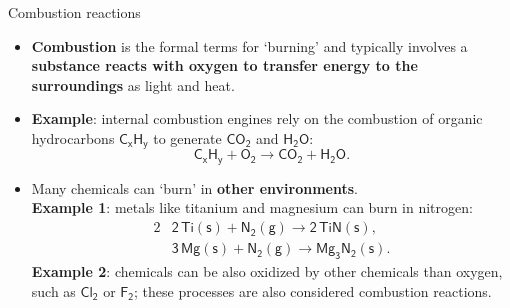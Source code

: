 \begin{frame}{Combustion reactions}

	\begin{itemize}
	\item \alert{\textbf{Combustion }} is the formal terms for `burning' and typically involves a \textbf{substance reacts with oxygen to transfer energy to the surroundings} as light and heat. \\
	 \item {\textbf{Example}}: internal combustion engines rely on the combustion of organic hydrocarbons  $\mathsf{C_xH_y}$  to generate  $\mathsf{CO_2}$  and   $\mathsf{H_2O}$:
	\[
	\mathsf{C_xH_y + O_2 \rightarrow CO_2 + H_2O.}
	\]
	\vskip -10pt
	\pause
	\item Many chemicals can `burn' in \textbf{other environments}. \\
	{\textbf{Example 1}}: metals like  titanium and magnesium can burn in nitrogen:
	\begin{alignat*}{2}
		& \mathsf{2\,Ti(s)+N_2(g) \rightarrow 2\, TiN(s),} \\
		& \mathsf{3\,Mg(s)+N_2(g) \rightarrow Mg_3N_2(s).} 
	\end{alignat*}
	{\textbf{Example 2}}: chemicals can be also oxidized by other chemicals than oxygen, such as $\mathsf{Cl_2}$ or $\mathsf{F_2}$; these processes are also considered combustion reactions.
	\end{itemize}
\end{frame}
%
